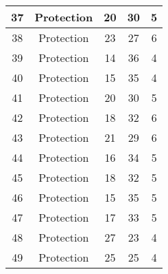 \documentclass[results.tex]{subfiles}
\begin{document}
\begin{center}
\begin{tabular}{| c || c | c | c | c |}
            \hline
            37                      & Protection                   & 20                     & 30                      & 5                    \\
            \hline
            38                      & Protection                   & 23                     & 27                      & 6                    \\
            \hline
            39                      & Protection                   & 14                     & 36                      & 4                    \\
            \hline
            40                      & Protection                   & 15                     & 35                      & 4                    \\
            \hline
            41                      & Protection                   & 20                     & 30                      & 5                    \\
            \hline
            42                      & Protection                   & 18                     & 32                      & 6                    \\
            \hline
            43                      & Protection                   & 21                     & 29                      & 6                    \\
            \hline
            44                      & Protection                   & 16                     & 34                      & 5                    \\
            \hline
            45                      & Protection                   & 18                     & 32                      & 5                    \\
            \hline
            46                      & Protection                   & 15                     & 35                      & 5                    \\
            \hline
            47                      & Protection                   & 17                     & 33                      & 5                    \\
            \hline
            48                      & Protection                   & 27                     & 23                      & 4                    \\
            \hline
            49                      & Protection                   & 25                     & 25                      & 4                    \\
            \hline
        \end{tabular}
    \end{center}
\end{document}
